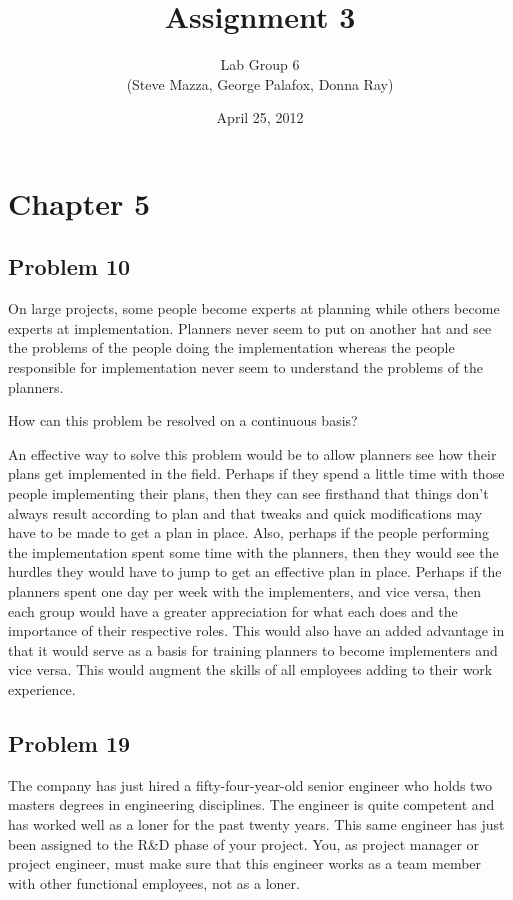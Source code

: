 \documentclass[letterpaper,10pt]{article}
\title{Assignment 3}
\author{Lab Group 6 \\ { \small (Steve Mazza, George Palafox, Donna Ray)}}
\date{April 25, 2012}
\begin{document}
\maketitle

\section*{Chapter 5}
\subsection*{Problem 10}
On large projects, some people become experts at planning while others become experts at implementation.  Planners never seem to put on another hat and see the problems of the people doing the implementation whereas the people responsible for implementation never seem to understand the problems of the planners.  

How can this problem be resolved on a continuous basis?

An effective way to solve this problem would be to allow planners see how their plans get implemented in the field.  Perhaps if they spend a little time with those people implementing their plans, then they can see firsthand that things don’t always result according to plan and that tweaks and quick modifications may have to be made to get a plan in place.  Also, perhaps if the people performing the implementation spent some time with the planners, then they would see the hurdles they would have to jump to get an effective plan in place.  Perhaps if the planners spent one day per week with the implementers, and vice versa, then each group would have a greater appreciation for what each does and the importance of their respective roles.  This would also have an added advantage in that it would serve as a basis for training planners to become implementers and vice versa.  This would augment the skills of all employees adding to their work experience.

\subsection*{Problem 19}
The company has just hired a fifty-four-year-old senior engineer who holds two masters degrees in engineering disciplines.  The engineer is quite competent and has worked well as a loner for the past twenty years.  This same engineer has just been assigned to the R\&D phase of your project.  You, as project manager or project engineer, must make sure that this engineer works as a team member with other functional employees, not as a loner. 
\end{document}
